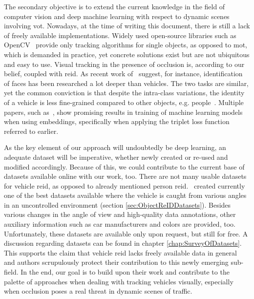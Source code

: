 The secondary objective is to extend the current knowledge in the field of computer vision and deep machine learning with respect to dynamic scenes involving \gls{vot}. Nowadays, at the time of writing this document, there is still a lack of freely available implementations. Widely used open-source libraries such as OpenCV~\cite{bradski2000opencv} provide only tracking algorithms for single objects, as opposed to \gls{mot}, which is demanded in practice, yet concrete solutions exist but are not ubiquitous and easy to use. Visual tracking in the presence of occlusion is, according to our belief, coupled with \gls{reid}. As recent work of~\cite{kuma2019vehiclereid} suggest, for instance, identification of faces has been researched a lot deeper than vehicles. The two tasks are similar, yet the common conviction is that despite the intra-class variations, the identity of a vehicle is less fine-grained compared to other objects, e.g. people~\cite{kuma2019vehiclereid}. Multiple papers, such as~\cite{schroff2015facenet, hermans2017triplet}, show promising results in training of machine learning models when using embeddings, specifically when applying the triplet loss function referred to earlier.

As the key element of our approach will undoubtedly be deep learning, an adequate dataset will be imperative, whether newly created or re-used and modified accordingly. Because of this, we could contribute to the current base of datasets available online with our work, too. There are not many usable datasets for vehicle \gls{reid}, as opposed to already mentioned person \gls{reid}.~\cite{liu2018provid, yan2017exploiting} created currently one of the best datasets available where the vehicle is caught from various angles in an uncontrolled environment (section \ref{sec:ObjectReIDDatasets}). Besides various changes in the angle of view and high-quality data annotations, other auxiliary information such as car manufacturers and colors are provided, too. Unfortunately, these datasets are available only upon request, but still for free. A discussion regarding datasets can be found in chapter \ref{chap:SurveyOfDatasets}. This supports the claim that vehicle \gls{reid} lacks freely available data in general and authors scrupulously protect their contribution to this newly emerging sub-field. In the end, our goal is to build upon their work and contribute to the palette of approaches when dealing with tracking vehicles visually, especially when occlusion poses a real threat in dynamic scenes of traffic.
